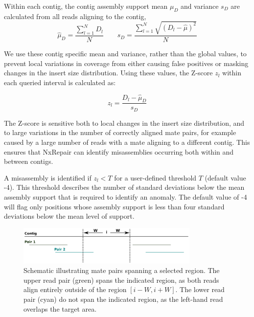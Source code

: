 \documentclass[fleqn,10pt]{wlpeerj}
\begin{document}
Within each contig, the contig assembly support mean $\mu_D$ and variance $s_D$ are calculated from all reads aligning to the contig,
\begin{equation}
\hat{\mu}_D = \frac{\sum_{l=1}^N D_l}{N} \qquad s_D = \frac{\sum_{l=1}^N \sqrt{(D_l - \hat{\mu})^2}}{N}
\label{eq:contigD}
\end{equation}

We use these contig specific mean and variance, rather than the global values, to prevent local variations in coverage from either causing false positives or masking changes in the insert size distribution. Using these values, the Z-score $z_l$ within each queried interval is calculated as: 

\begin{equation}
z_l = \frac{D_l - \hat{\mu}_D}{s_D}
\label{eq:zscore}
\end{equation}

The Z-score is sensitive both to local changes in the insert size distribution, and to large variations in the number of correctly aligned mate pairs, for example caused by a large number of reads with a mate aligning to a different contig. This ensures that NxRepair can identify misassemblies occurring both within and between contigs.  

A misassembly is identified if $z_l < T$ for a user-defined threshold $T$ (default value -4). This threshold describes the number of standard deviations below the mean assembly support that is required to identify an anomaly. The default value of -4 will flag only positions whose assembly support is less than four standard deviations below the mean level of support.

\begin{figure}
\centerline{\includegraphics[width=0.8\textwidth]{spanning.pdf}}
\caption{Schematic illustrating mate pairs spanning a selected region. The upper read pair (green) spans the indicated region, as both reads align entirely outside of the region $[i-W, i+W]$. The lower read pair (cyan) do not span the indicated region, as the left-hand read overlaps the target area. \label{fig:spanning}}
\end{figure}
\end{document}
